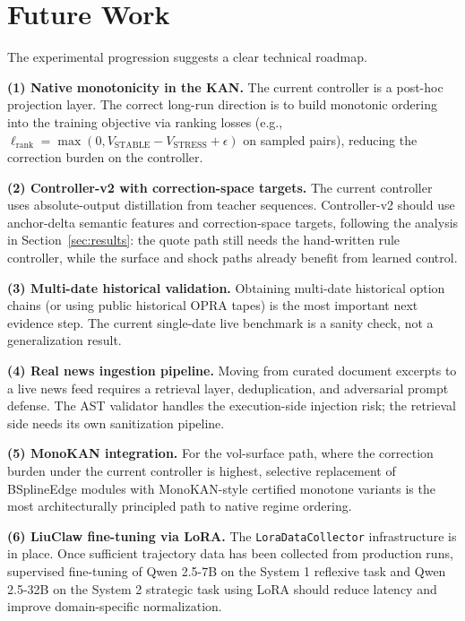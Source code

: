 \documentclass[11pt,a4paper]{article}
\begin{document}
\section{Future Work}
\label{sec:future}

The experimental progression suggests a clear technical roadmap.

\textbf{(1) Native monotonicity in the KAN.} The current controller is a post-hoc projection layer. The correct long-run direction is to build monotonic ordering into the training objective via ranking losses (e.g., $\ell_\text{rank} = \max(0, V_\text{STABLE} - V_\text{STRESS} + \epsilon)$ on sampled pairs), reducing the correction burden on the controller.

\textbf{(2) Controller-v2 with correction-space targets.} The current controller uses absolute-output distillation from teacher sequences. Controller-v2 should use anchor-delta semantic features and correction-space targets, following the analysis in Section~\ref{sec:results}: the quote path still needs the hand-written rule controller, while the surface and shock paths already benefit from learned control.

\textbf{(3) Multi-date historical validation.} Obtaining multi-date historical option chains (or using public historical OPRA tapes) is the most important next evidence step. The current single-date live benchmark is a sanity check, not a generalization result.

\textbf{(4) Real news ingestion pipeline.} Moving from curated document excerpts to a live news feed requires a retrieval layer, deduplication, and adversarial prompt defense. The AST validator handles the execution-side injection risk; the retrieval side needs its own sanitization pipeline.

\textbf{(5) MonoKAN integration.} For the vol-surface path, where the correction burden under the current controller is highest, selective replacement of BSplineEdge modules with MonoKAN-style certified monotone variants \citep{polo_molina_etal_2024_monokan} is the most architecturally principled path to native regime ordering.

\textbf{(6) LiuClaw fine-tuning via LoRA.} The \texttt{LoraDataCollector} infrastructure is in place. Once sufficient trajectory data has been collected from production runs, supervised fine-tuning of Qwen 2.5-7B on the System 1 reflexive task and Qwen 2.5-32B on the System 2 strategic task using LoRA \citep{hu2021lora} should reduce latency and improve domain-specific normalization.
\end{document}
